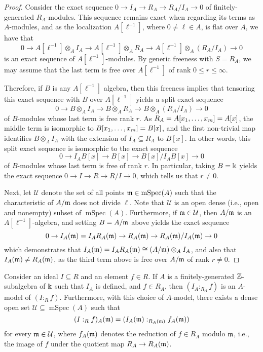 \documentclass[11pt]{amsart}
\newcommand{\mspec}{\operatorname{mSpec}}
\begin{document}
\begin{proof}
   Consider the exact sequence $0 \to I_A \to R_A \to R_A/I_A \to 0$ of finitely-generated $R_A$-modules.
   This sequence remains exact when regarding its terms as $A$-modules, and as the localization $A[\ell^{-1}]$, where $0 \ne \ell \in A$, is flat over $A$, we have that
   \[
      0 \to A[\ell^{-1}] \otimes_A I_A \to A[\ell^{-1}] \otimes_A R_A \to A[\ell^{-1}] \otimes_A (R_A/I_A) \to 0
   \]
   is an exact sequence of $A[\ell^{-1}]$-modules.
   By generic freeness with $S=R_A$, we may assume that the last term is free over $A[\ell^{-1}]$ of rank $0 \leq r \leq \infty$.

   Therefore,  if $B$ is any $A[\ell^{-1}]$ algebra, then this freeness implies that tensoring this exact sequence with $B$ over $A[\ell^{-1}]$ yields a split exact sequence
   \[
      0 \to B \otimes_A I_A \to B \otimes_A R_A \to B \otimes_A (R_A/I_A) \to 0
   \]
   of $B$-modules whose last term is free rank $r$.
   As $R_A = A[x_1, \ldots, x_m]=A[x]$, the middle term is isomorphic to $B[x_1, \ldots, x_m]=B[x]$,  and the first non-trivial map identifies $B \otimes_A I_A$ with the extension of $I_A \subseteq R_A$ to $B[x]$.
   In other words, this split exact sequence is isomorphic to the exact sequence
   \[
      0 \to I_A  B[x] \to B[x] \to  B[x] / I_A B[x]  \to 0
   \]
   of $B$-modules whose last term is free of rank $r$.
   In particular, taking $B=\Bbbk$ yields the exact sequence $0 \to I \to R \to R/I \to 0$, which tells us that $r \neq 0$.

   Next, let $\mathcal{U}$ denote the set of all points $\maxi \in \mspec(A)$ such that the characteristic of $A/\mathfrak{m}$ does not divide $\ell$.
   Note that $\mathcal{U}$ is an open dense (i.e., open and nonempty) subset of $\mspec(A)$.  Furthermore, if $\mathfrak{m} \in \mathcal{U}$, then $A/\mathfrak{m}$ is an $A[\ell^{-1}]$-algebra, and setting $B=A/\mathfrak{m}$ above yields the exact sequence
   \[
      0 \to I_A(\mathfrak{m}) = I_A R_A(\mathfrak{m}) \to R_A(\mathfrak{m}) \to R_A(\mathfrak{m})/ I_A(\mathfrak{m}) \to 0
   \]
   which demonstrates that $I_A(\mathfrak{m}) = I_A R_A(\mathfrak{m})  \cong (A/\mathfrak{m}) \otimes_A I_A$, and also that $I_A(\mathfrak{m}) \neq R_A(\mathfrak{m})$, as the third term above is free over $A/\mathfrak{m}$ of rank $r \neq 0$.
\end{proof}

\begin{lemma}
   \label{colon mod p: L}
   Consider an ideal $I \subseteq R$ and an element $f \in R$.
   If $A$ is a finitely-generated $\mathbb{Z}$-subalgebra of $\Bbbk$ such that $I_A$ is defined, and $f \in R_A$, then  $(I_A :_{R_A} f)$ is an $A$-model of $(I:_R f)$.
   Furthermore, with this choice of $A$-model, there exists a dense open set $\mathcal{U} \subseteq \mspec(A)$ such that
   \[
      (I :_R f)_A(\mathfrak{m}) = (I_A(\mathfrak{m}) :_{R_A(\mathfrak{m})} f_A(\mathfrak{m}))
   \]
   for every $\mathfrak{m} \in \mathcal{U}$, where $f_A(\mathfrak{m})$ denotes the reduction of $f \in R_A$ modulo $\mathfrak{m}$, i.e., the image of $f$ under the quotient map $R_A \to R_A(\mathfrak{m})$.
 \end{lemma}
\end{document}
